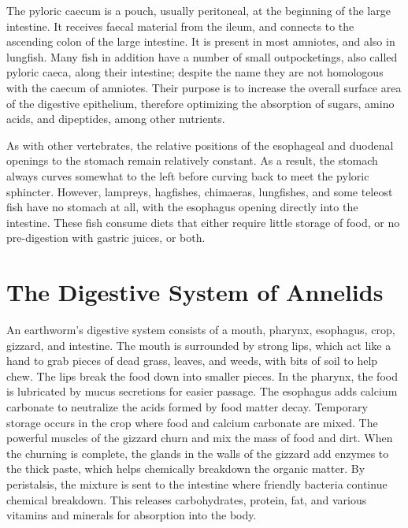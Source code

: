 The pyloric caecum is a pouch, usually peritoneal, at the beginning of the large intestine. It receives faecal material from the ileum, and connects to the ascending colon of the large intestine. It is present in most amniotes, and also in lungfish. Many fish in addition have a number of small outpocketings, also called pyloric caeca, along their intestine; despite the name they are not homologous with the caecum of amniotes. Their purpose is to increase the overall surface area of the digestive epithelium, therefore optimizing the absorption of sugars, amino acids, and dipeptides, among other nutrients.

As with other vertebrates, the relative positions of the esophageal and duodenal openings to the stomach remain relatively constant. As a result, the stomach always curves somewhat to the left before curving back to meet the pyloric sphincter. However, lampreys, hagfishes, chimaeras, lungfishes, and some teleost fish have no stomach at all, with the esophagus opening directly into the intestine. These fish consume diets that either require little storage of food, or no pre-digestion with gastric juices, or both.

\hypertarget{the-digestive-system-of-annelids}{%
\section{The Digestive System of Annelids}\label{the-digestive-system-of-annelids}}

An earthworm's digestive system consists of a mouth, pharynx, esophagus, crop, gizzard, and intestine. The mouth is surrounded by strong lips, which act like a hand to grab pieces of dead grass, leaves, and weeds, with bits of soil to help chew. The lips break the food down into smaller pieces. In the pharynx, the food is lubricated by mucus secretions for easier passage. The esophagus adds calcium carbonate to neutralize the acids formed by food matter decay. Temporary storage occurs in the crop where food and calcium carbonate are mixed. The powerful muscles of the gizzard churn and mix the mass of food and dirt. When the churning is complete, the glands in the walls of the gizzard add enzymes to the thick paste, which helps chemically breakdown the organic matter. By peristalsis, the mixture is sent to the intestine where friendly bacteria continue chemical breakdown. This releases carbohydrates, protein, fat, and various vitamins and minerals for absorption into the body.


